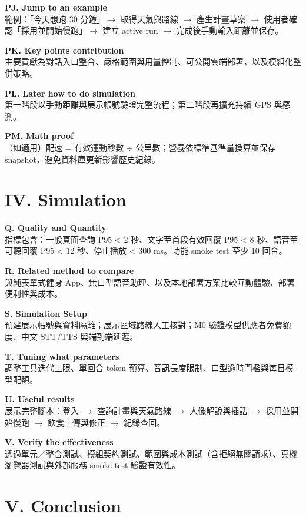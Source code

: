\documentclass[12pt,a4paper]{article}
\begin{document}
\textbf{PJ. Jump to an example} \\
範例：「今天想跑 30 分鐘」$\rightarrow$ 取得天氣與路線 $\rightarrow$ 產生計畫草案 $\rightarrow$ 使用者確認「採用並開始慢跑」$\rightarrow$ 建立 active run $\rightarrow$ 完成後手動輸入距離並保存。

\textbf{PK. Key points contribution} \\
主要貢獻為對話入口整合、嚴格範圍與用量控制、可公開雲端部署，以及模組化整併策略。

\textbf{PL. Later how to do simulation} \\
第一階段以手動距離與展示帳號驗證完整流程；第二階段再擴充持續 GPS 與感測。

\textbf{PM. Math proof} \\
（如適用）配速 = 有效運動秒數 $\div$ 公里數；營養依標準基準量換算並保存 snapshot，避免資料庫更新影響歷史紀錄。

\section{IV. Simulation}

\textbf{Q. Quality and Quantity} \\
指標包含：一般頁面查詢 P95 < 2 秒、文字至首段有效回覆 P95 < 8 秒、語音至可聽回覆 P95 < 12 秒、停止播放 < 300 ms。功能 smoke test 至少 10 回合。

\textbf{R. Related method to compare} \\
與純表單式健身 App、無口型語音助理、以及本地部署方案比較互動體驗、部署便利性與成本。

\textbf{S. Simulation Setup} \\
預建展示帳號與資料隔離；展示區域路線人工核對；M0 驗證模型供應者免費額度、中文 STT/TTS 與端到端延遲。

\textbf{T. Tuning what parameters} \\
調整工具迭代上限、單回合 token 預算、音訊長度限制、口型逾時門檻與每日模型配額。

\textbf{U. Useful results} \\
展示完整腳本：登入 $\rightarrow$ 查詢計畫與天氣路線 $\rightarrow$ 人像解說與插話 $\rightarrow$ 採用並開始慢跑 $\rightarrow$ 飲食上傳與修正 $\rightarrow$ 紀錄查回。

\textbf{V. Verify the effectiveness} \\
透過單元／整合測試、模組契約測試、範圍與成本測試（含拒絕無關請求）、真機瀏覽器測試與外部服務 smoke test 驗證有效性。

\section{V. Conclusion}
\end{document}
